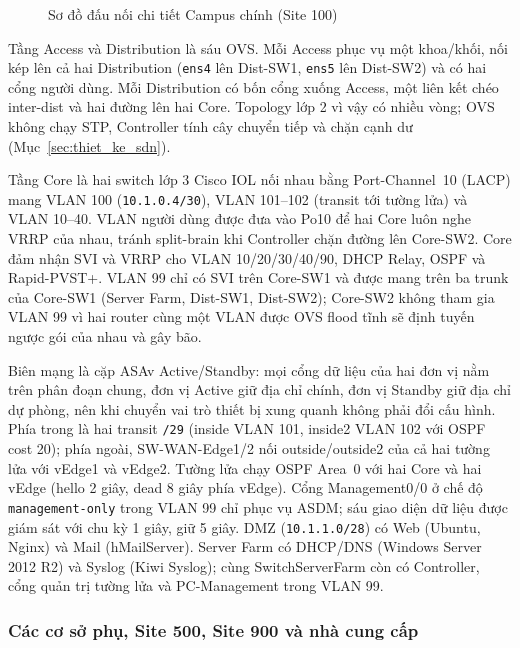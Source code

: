{\begin{landscape}
\begin{figure}[p]
{{%
    }}
    \caption{Sơ đồ đấu nối chi tiết Campus chính (Site 100)}
    \label{fig:topology_site100}
\end{figure}
\end{landscape}}


Tầng Access và Distribution là sáu OVS. Mỗi Access phục vụ một khoa/khối, nối kép lên cả hai Distribution (\texttt{ens4} lên Dist-SW1, \texttt{ens5} lên Dist-SW2) và có hai cổng người dùng. Mỗi Distribution có bốn cổng xuống Access, một liên kết chéo inter-dist và hai đường lên hai Core. Topology lớp 2 vì vậy có nhiều vòng; OVS không chạy STP, Controller tính cây chuyển tiếp và chặn cạnh dư (Mục~\ref{sec:thiet_ke_sdn}).

Tầng Core là hai switch lớp 3 Cisco IOL nối nhau bằng Port-Channel~10 (LACP) mang VLAN 100 (\texttt{10.1.0.4/30}), VLAN 101--102 (transit tới tường lửa) và VLAN 10--40. VLAN người dùng được đưa vào Po10 để hai Core luôn nghe VRRP của nhau, tránh split-brain khi Controller chặn đường lên Core-SW2. Core đảm nhận SVI và VRRP cho VLAN 10/20/30/40/90, DHCP Relay, OSPF và Rapid-PVST+. VLAN 99 chỉ có SVI trên Core-SW1 và được mang trên ba trunk của Core-SW1 (Server Farm, Dist-SW1, Dist-SW2); Core-SW2 không tham gia VLAN 99 vì hai router cùng một VLAN được OVS flood tĩnh sẽ định tuyến ngược gói của nhau và gây bão.

Biên mạng là cặp ASAv Active/Standby: mọi cổng dữ liệu của hai đơn vị nằm trên phân đoạn chung, đơn vị Active giữ địa chỉ chính, đơn vị Standby giữ địa chỉ dự phòng, nên khi chuyển vai trò thiết bị xung quanh không phải đổi cấu hình. Phía trong là hai transit \texttt{/29} (inside VLAN 101, inside2 VLAN 102 với OSPF cost 20); phía ngoài, SW-WAN-Edge1/2 nối outside/outside2 của cả hai tường lửa với vEdge1 và vEdge2. Tường lửa chạy OSPF Area~0 với hai Core và hai vEdge (hello 2 giây, dead 8 giây phía vEdge). Cổng Management0/0 ở chế độ \texttt{management-only} trong VLAN 99 chỉ phục vụ ASDM; sáu giao diện dữ liệu được giám sát với chu kỳ 1 giây, giữ 5 giây. DMZ (\texttt{10.1.1.0/28}) có Web (Ubuntu, Nginx) và Mail (hMailServer). Server Farm có DHCP/DNS (Windows Server 2012 R2) và Syslog (Kiwi Syslog); cùng SwitchServerFarm còn có Controller, cổng quản trị tường lửa và PC-Management trong VLAN 99.


\subsubsection{Các cơ sở phụ, Site 500, Site 900 và nhà cung cấp}


